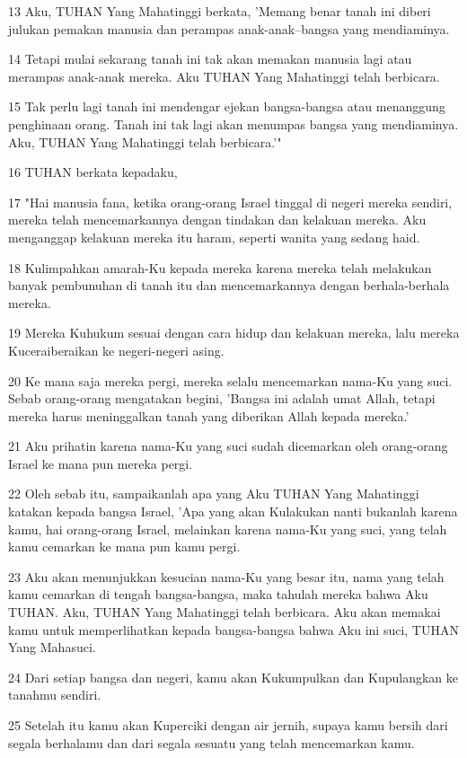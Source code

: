 \par 13 Aku, TUHAN Yang Mahatinggi berkata, 'Memang benar tanah ini diberi julukan pemakan manusia dan perampas anak-anak--bangsa yang mendiaminya.
\par 14 Tetapi mulai sekarang tanah ini tak akan memakan manusia lagi atau merampas anak-anak mereka. Aku TUHAN Yang Mahatinggi telah berbicara.
\par 15 Tak perlu lagi tanah ini mendengar ejekan bangsa-bangsa atau menanggung penghinaan orang. Tanah ini tak lagi akan menumpas bangsa yang mendiaminya. Aku, TUHAN Yang Mahatinggi telah berbicara.'"
\par 16 TUHAN berkata kepadaku,
\par 17 "Hai manusia fana, ketika orang-orang Israel tinggal di negeri mereka sendiri, mereka telah mencemarkannya dengan tindakan dan kelakuan mereka. Aku menganggap kelakuan mereka itu haram, seperti wanita yang sedang haid.
\par 18 Kulimpahkan amarah-Ku kepada mereka karena mereka telah melakukan banyak pembunuhan di tanah itu dan mencemarkannya dengan berhala-berhala mereka.
\par 19 Mereka Kuhukum sesuai dengan cara hidup dan kelakuan mereka, lalu mereka Kuceraiberaikan ke negeri-negeri asing.
\par 20 Ke mana saja mereka pergi, mereka selalu mencemarkan nama-Ku yang suci. Sebab orang-orang mengatakan begini, 'Bangsa ini adalah umat Allah, tetapi mereka harus meninggalkan tanah yang diberikan Allah kepada mereka.'
\par 21 Aku prihatin karena nama-Ku yang suci sudah dicemarkan oleh orang-orang Israel ke mana pun mereka pergi.
\par 22 Oleh sebab itu, sampaikanlah apa yang Aku TUHAN Yang Mahatinggi katakan kepada bangsa Israel, 'Apa yang akan Kulakukan nanti bukanlah karena kamu, hai orang-orang Israel, melainkan karena nama-Ku yang suci, yang telah kamu cemarkan ke mana pun kamu pergi.
\par 23 Aku akan menunjukkan kesucian nama-Ku yang besar itu, nama yang telah kamu cemarkan di tengah bangsa-bangsa, maka tahulah mereka bahwa Aku TUHAN. Aku, TUHAN Yang Mahatinggi telah berbicara. Aku akan memakai kamu untuk memperlihatkan kepada bangsa-bangsa bahwa Aku ini suci, TUHAN Yang Mahasuci.
\par 24 Dari setiap bangsa dan negeri, kamu akan Kukumpulkan dan Kupulangkan ke tanahmu sendiri.
\par 25 Setelah itu kamu akan Kuperciki dengan air jernih, supaya kamu bersih dari segala berhalamu dan dari segala sesuatu yang telah mencemarkan kamu.

